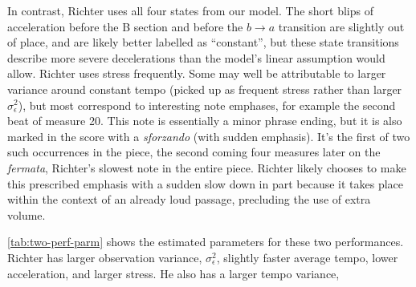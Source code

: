 \documentclass[aoas]{imsart}
\begin{document}
In contrast, Richter uses all four states from our model. The short
blips of acceleration before the B section and before the
$b \rightarrow a$ transition are slightly out of place, and are
likely better labelled as ``constant'', but these state transitions
describe more severe decelerations than the model's linear
assumption would allow. Richter uses stress frequently. Some may well be
attributable to larger variance around constant tempo (picked up as
frequent stress rather than larger $\sigma^2_\epsilon$), but most
correspond to interesting note emphases, for example the second beat
of measure 20. This note is essentially a minor phrase ending, but it is
also marked in the score with a {\em sforzando} (with sudden
emphasis). It's the first of two such occurrences in the piece, the
second coming four measures later on the {\em fermata}, Richter's slowest
note in the entire piece. Richter likely chooses to make this
prescribed emphasis with a sudden slow down in part because it takes
place within the context of an already loud passage, precluding the
use of extra volume.
\begin{table}[tb]
  \centering
  \caption{The estimated parameters for performances by Richter and
    Hatto.}
\label{tab:two-perf-parm}
\end{table}
\autoref{tab:two-perf-parm} shows the estimated parameters for these
two performances. Richter has larger observation variance,
$\sigma^2_{\epsilon}$, slightly faster average tempo, lower
acceleration, and larger stress. He also has a larger tempo variance,
\end{document}
